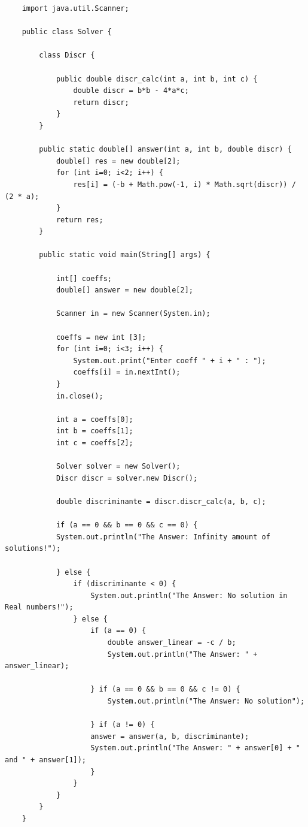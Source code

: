 \documentclass[a4paper]{article}
\begin{document}
\begin{lstlisting}
    import java.util.Scanner;

    public class Solver {
    
        class Discr {
    
            public double discr_calc(int a, int b, int c) {
                double discr = b*b - 4*a*c;
                return discr;
            }
        }
    
        public static double[] answer(int a, int b, double discr) {
            double[] res = new double[2];
            for (int i=0; i<2; i++) {
                res[i] = (-b + Math.pow(-1, i) * Math.sqrt(discr)) / (2 * a);
            }
            return res;
        }
    
        public static void main(String[] args) {
    
            int[] coeffs;
            double[] answer = new double[2];
    
            Scanner in = new Scanner(System.in);
    
            coeffs = new int [3];
            for (int i=0; i<3; i++) {
                System.out.print("Enter coeff " + i + " : ");
                coeffs[i] = in.nextInt();
            }
            in.close();
    
            int a = coeffs[0];
            int b = coeffs[1];
            int c = coeffs[2];
    
            Solver solver = new Solver();
            Discr discr = solver.new Discr();
    
            double discriminante = discr.discr_calc(a, b, c);
    
            if (a == 0 && b == 0 && c == 0) {
            System.out.println("The Answer: Infinity amount of solutions!");
    
            } else {
                if (discriminante < 0) {
                    System.out.println("The Answer: No solution in Real numbers!");
                } else {
                    if (a == 0) {
                        double answer_linear = -c / b;
                        System.out.println("The Answer: " + answer_linear);
        
                    } if (a == 0 && b == 0 && c != 0) {
                        System.out.println("The Answer: No solution");
        
                    } if (a != 0) {
                    answer = answer(a, b, discriminante);
                    System.out.println("The Answer: " + answer[0] + " and " + answer[1]);
                    }
                }
            } 
        }
    }    
\end{lstlisting}
\end{document}
